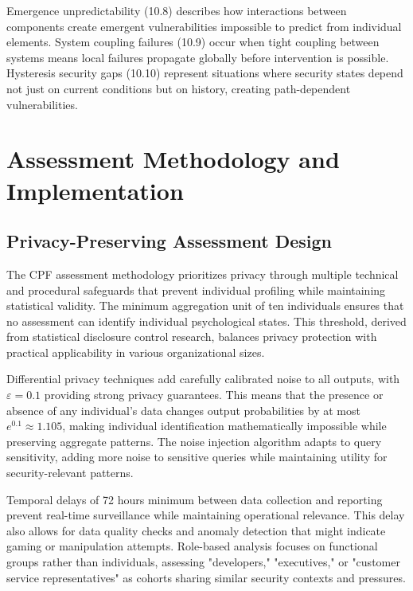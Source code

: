 \documentclass[manuscript,screen,review]{acmart}
\begin{document}
Emergence unpredictability (10.8) describes how interactions between components create emergent vulnerabilities impossible to predict from individual elements. System coupling failures (10.9) occur when tight coupling between systems means local failures propagate globally before intervention is possible. Hysteresis security gaps (10.10) represent situations where security states depend not just on current conditions but on history, creating path-dependent vulnerabilities.

\section{Assessment Methodology and Implementation}

\subsection{Privacy-Preserving Assessment Design}

The CPF assessment methodology prioritizes privacy through multiple technical and procedural safeguards that prevent individual profiling while maintaining statistical validity. The minimum aggregation unit of ten individuals ensures that no assessment can identify individual psychological states. This threshold, derived from statistical disclosure control research, balances privacy protection with practical applicability in various organizational sizes.

Differential privacy techniques add carefully calibrated noise to all outputs, with $\varepsilon = 0.1$ providing strong privacy guarantees. This means that the presence or absence of any individual's data changes output probabilities by at most $e^{0.1} \approx 1.105$, making individual identification mathematically impossible while preserving aggregate patterns. The noise injection algorithm adapts to query sensitivity, adding more noise to sensitive queries while maintaining utility for security-relevant patterns.

Temporal delays of 72 hours minimum between data collection and reporting prevent real-time surveillance while maintaining operational relevance. This delay also allows for data quality checks and anomaly detection that might indicate gaming or manipulation attempts. Role-based analysis focuses on functional groups rather than individuals, assessing "developers," "executives," or "customer service representatives" as cohorts sharing similar security contexts and pressures.
\end{document}
